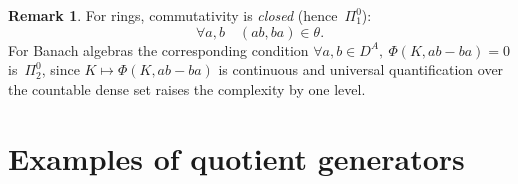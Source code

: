 \documentclass[12pt,fleqn,a4paper]{amsart}
\numberwithin{equation}{section}
\theoremstyle{definition}
\newtheorem{remark}[theorem]{Remark}
\begin{document}
\begin{remark}\label{rem:disc-vs-cont}
For rings, commutativity is \emph{closed} (hence~$\Pi^0_1$):
\[
        \forall a,b\quad (ab,ba)\in\theta .
\]
For Banach algebras the corresponding condition
$\forall a,b\in D^A,\ \Phi(K,ab-ba)=0$
is~$\Pi^0_2$, since $K\mapsto\Phi(K,ab-ba)$ is continuous and universal
quantification over the countable dense set raises the complexity by one level.
\end{remark}

\section{Examples of quotient generators}\label{sec:examples}
\end{document}
